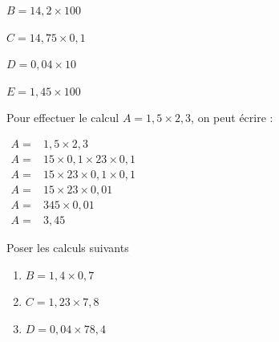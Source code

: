 \documentclass[a4paper]{book}
\begin{document}
\begin{exercice}
\begin{enumerate}[leftmargin=*]
\begin{minipage}{0.18\linewidth}
                \vspace{1cm}
            \end{minipage}
            \hfill \vline \hfill
            \begin{minipage}{0.18\linewidth}
                $B=14,2\times100$

                \vspace{1cm}
            \end{minipage}
            \hfill \vline \hfill
            \begin{minipage}{0.18\linewidth}
                $C=14,75\times0,1$

                \vspace{1cm}
            \end{minipage}
            \hfill \vline \hfill
            \begin{minipage}{0.18\linewidth}
                $D=0,04\times10$

                \vspace{1cm}
            \end{minipage}
            \hfill \vline \hfill
            \begin{minipage}{0.18\linewidth}
                $E=1,45\times100$

                \vspace{1cm}       
            \end{minipage}  
        \end{enumerate}
    \end{exercice}


    \begin{exercice}
        Pour effectuer le calcul $A=1,5\times2,3$, on peut écrire : 

        $\begin{array}{ll}
            A= & 1,5\times2,3 \\
            A= & 15\times0,1\times23\times0,1 \\
            A= & 15\times23\times0,1\times0,1 \\
            A= & 15\times23\times0,01 \\
            A= & 345 \times 0,01 \\
            A= & 3,45
        \end{array}$

        Poser les calculs suivants 
        \begin{enumerate}
            \item $B=1,4\times0,7$

            \item $C=1,23\times7,8$

            \item $D=0,04\times78,4$
        \end{enumerate}
    \end{exercice}
\end{document}
